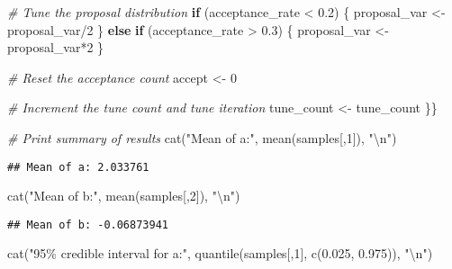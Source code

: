 \documentclass[
]{article}
\newenvironment{Shaded}{\begin{snugshade}}{\end{snugshade}}
\newcommand{\CommentTok}[1]{\textcolor[rgb]{0.56,0.35,0.01}{\textit{#1}}}
\newcommand{\ControlFlowTok}[1]{\textcolor[rgb]{0.13,0.29,0.53}{\textbf{#1}}}
\newcommand{\DecValTok}[1]{\textcolor[rgb]{0.00,0.00,0.81}{#1}}
\newcommand{\FloatTok}[1]{\textcolor[rgb]{0.00,0.00,0.81}{#1}}
\newcommand{\FunctionTok}[1]{\textcolor[rgb]{0.00,0.00,0.00}{#1}}
\newcommand{\NormalTok}[1]{#1}
\newcommand{\OtherTok}[1]{\textcolor[rgb]{0.56,0.35,0.01}{#1}}
\newcommand{\SpecialCharTok}[1]{\textcolor[rgb]{0.00,0.00,0.00}{#1}}
\newcommand{\StringTok}[1]{\textcolor[rgb]{0.31,0.60,0.02}{#1}}
\begin{document}
\begin{Shaded}
\begin{Highlighting}[]
    \CommentTok{\# Tune the proposal distribution}
    \ControlFlowTok{if}\NormalTok{ (acceptance\_rate }\SpecialCharTok{\textless{}} \FloatTok{0.2}\NormalTok{) \{}
\NormalTok{      proposal\_var }\OtherTok{\textless{}{-}}\NormalTok{ proposal\_var}\SpecialCharTok{/}\DecValTok{2}
\NormalTok{    \} }\ControlFlowTok{else} \ControlFlowTok{if}\NormalTok{ (acceptance\_rate }\SpecialCharTok{\textgreater{}} \FloatTok{0.3}\NormalTok{) \{}
\NormalTok{      proposal\_var }\OtherTok{\textless{}{-}}\NormalTok{ proposal\_var}\SpecialCharTok{*}\DecValTok{2}
\NormalTok{    \}}
    
    \CommentTok{\# Reset the acceptance count}
\NormalTok{    accept }\OtherTok{\textless{}{-}} \DecValTok{0}
    
    \CommentTok{\# Increment the tune count and tune iteration}
\NormalTok{    tune\_count }\OtherTok{\textless{}{-}}\NormalTok{ tune\_count}
\NormalTok{  \}\}  }
    
\CommentTok{\# Print summary of results}
\FunctionTok{cat}\NormalTok{(}\StringTok{"Mean of a:"}\NormalTok{, }\FunctionTok{mean}\NormalTok{(samples[,}\DecValTok{1}\NormalTok{]), }\StringTok{"}\SpecialCharTok{\textbackslash{}n}\StringTok{"}\NormalTok{)}
\end{Highlighting}
\end{Shaded}

\begin{verbatim}
## Mean of a: 2.033761
\end{verbatim}

\begin{Shaded}
\begin{Highlighting}[]
\FunctionTok{cat}\NormalTok{(}\StringTok{"Mean of b:"}\NormalTok{, }\FunctionTok{mean}\NormalTok{(samples[,}\DecValTok{2}\NormalTok{]), }\StringTok{"}\SpecialCharTok{\textbackslash{}n}\StringTok{"}\NormalTok{)}
\end{Highlighting}
\end{Shaded}

\begin{verbatim}
## Mean of b: -0.06873941
\end{verbatim}

\begin{Shaded}
\begin{Highlighting}[]
\FunctionTok{cat}\NormalTok{(}\StringTok{"95\% credible interval for a:"}\NormalTok{, }\FunctionTok{quantile}\NormalTok{(samples[,}\DecValTok{1}\NormalTok{], }\FunctionTok{c}\NormalTok{(}\FloatTok{0.025}\NormalTok{, }\FloatTok{0.975}\NormalTok{)), }\StringTok{"}\SpecialCharTok{\textbackslash{}n}\StringTok{"}\NormalTok{)}
\end{Highlighting}
\end{Shaded}
\end{document}
